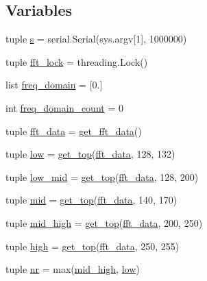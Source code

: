 \subsection*{Variables}
\begin{DoxyCompactItemize}
\item 
tuple \hyperlink{namespacelampa2_ad18f2b839fd9605a96df3cadcf710a55}{s} = serial.\+Serial(sys.\+argv\mbox{[}1\mbox{]}, 1000000)
\item 
tuple \hyperlink{namespacelampa2_af190776ce002434d902e9fa656949eae}{fft\+\_\+lock} = threading.\+Lock()
\item 
list \hyperlink{namespacelampa2_af51ab190cd522ff9a865cb7398734215}{freq\+\_\+domain} = \mbox{[}0.\mbox{]}
\item 
int \hyperlink{namespacelampa2_a9bb8fdc41ec8a48e18b36891175c745d}{freq\+\_\+domain\+\_\+count} = 0
\item 
tuple \hyperlink{namespacelampa2_af0327ebf49f7e611e30336ab1506369a}{fft\+\_\+data} = \hyperlink{namespacelampa2_a61fc5a989d9d50e6d469d21f3854d572}{get\+\_\+fft\+\_\+data}()
\item 
tuple \hyperlink{namespacelampa2_afc6a24941cf04cc521960968ff7ccb08}{low} = \hyperlink{namespacelampa2_adaab29c56d95f42dd9452720dab1eef2}{get\+\_\+top}(\hyperlink{namespacelampa2_af0327ebf49f7e611e30336ab1506369a}{fft\+\_\+data}, 128, 132)
\item 
tuple \hyperlink{namespacelampa2_a1e1a1f6470f623e1e30ceda1b006de00}{low\+\_\+mid} = \hyperlink{namespacelampa2_adaab29c56d95f42dd9452720dab1eef2}{get\+\_\+top}(\hyperlink{namespacelampa2_af0327ebf49f7e611e30336ab1506369a}{fft\+\_\+data}, 128, 200)
\item 
tuple \hyperlink{namespacelampa2_af8c3daba100afcfcba0f78e87d857de3}{mid} = \hyperlink{namespacelampa2_adaab29c56d95f42dd9452720dab1eef2}{get\+\_\+top}(\hyperlink{namespacelampa2_af0327ebf49f7e611e30336ab1506369a}{fft\+\_\+data}, 140, 170)
\item 
tuple \hyperlink{namespacelampa2_ae7917682e1f41e81083f6c39c5224ced}{mid\+\_\+high} = \hyperlink{namespacelampa2_adaab29c56d95f42dd9452720dab1eef2}{get\+\_\+top}(\hyperlink{namespacelampa2_af0327ebf49f7e611e30336ab1506369a}{fft\+\_\+data}, 200, 250)
\item 
tuple \hyperlink{namespacelampa2_a8f36218af5f002947063519cf953b9ef}{high} = \hyperlink{namespacelampa2_adaab29c56d95f42dd9452720dab1eef2}{get\+\_\+top}(\hyperlink{namespacelampa2_af0327ebf49f7e611e30336ab1506369a}{fft\+\_\+data}, 250, 255)
\item 
tuple \hyperlink{namespacelampa2_ad53fee82d4e84bd88c269579fbfaca7b}{nr} = max(\hyperlink{namespacelampa2_ae7917682e1f41e81083f6c39c5224ced}{mid\+\_\+high}, \hyperlink{namespacelampa2_afc6a24941cf04cc521960968ff7ccb08}{low})

\end{DoxyCompactItemize}
